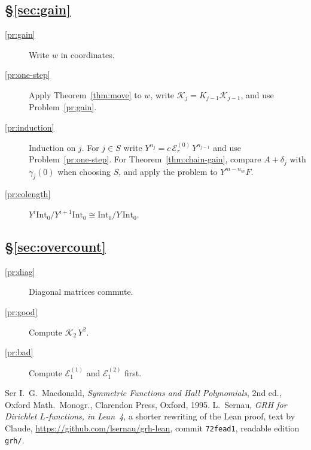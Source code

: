 \documentclass[reqno]{amsart}
\theoremstyle{definition}
\theoremstyle{plain}
\theoremstyle{remark}
\newcommand{\Ec}{\mathcal{E}}
\newcommand{\Kc}{\mathcal{K}}
\newcommand{\Int}{\mathrm{Int}}
\begin{document}
\subsection*{\S\ref{sec:gain}}
\begin{description}
\item[\ref{pr:gain}] Write \(w\) in coordinates.
\item[\ref{pr:one-step}] Apply Theorem~\ref{thm:move} to \(w\), write \(\Kc_j = K_{j-1}\Kc_{j-1}\), and use Problem~\ref{pr:gain}.
\item[\ref{pr:induction}] Induction on \(j\).  For \(j \in S\) write \(Y^{n_j} = c\,\Ec^{(0)}_r\, Y^{n_{j-1}}\) and use Problem~\ref{pr:one-step}.  For Theorem~\ref{thm:chain-gain}, compare \(A+\delta_j\) with \(\gamma_j(0)\) when choosing \(S\), and apply the problem to \(Y^{m-n_m}F\).
\item[\ref{pr:colength}] \(Y^i\Int_0 / Y^{i+1}\Int_0 \cong \Int_0/Y\,\Int_0\).
\end{description}

\subsection*{\S\ref{sec:overcount}}
\begin{description}
\item[\ref{pr:diag}] Diagonal matrices commute.
\item[\ref{pr:good}] Compute \(\Kc_2\, Y^2\).
\item[\ref{pr:bad}] Compute \(\Ec^{(1)}_1\) and \(\Ec^{(2)}_1\) first.
\end{description}

{\small\begin{thebibliography}{Ser}
 I.~G.~Macdonald, \emph{Symmetric Functions and Hall Polynomials}, 2nd ed., Oxford Math.\ Monogr., Clarendon Press, Oxford, 1995.
 L.~Sernau, \emph{GRH for Dirichlet \(L\)-functions, in Lean~4}, a shorter rewriting of the Lean proof, text by Claude, \url{https://github.com/lsernau/grh-lean}, commit \texttt{72fead1}, readable edition \texttt{grh/}.
\end{thebibliography}}
\end{document}
